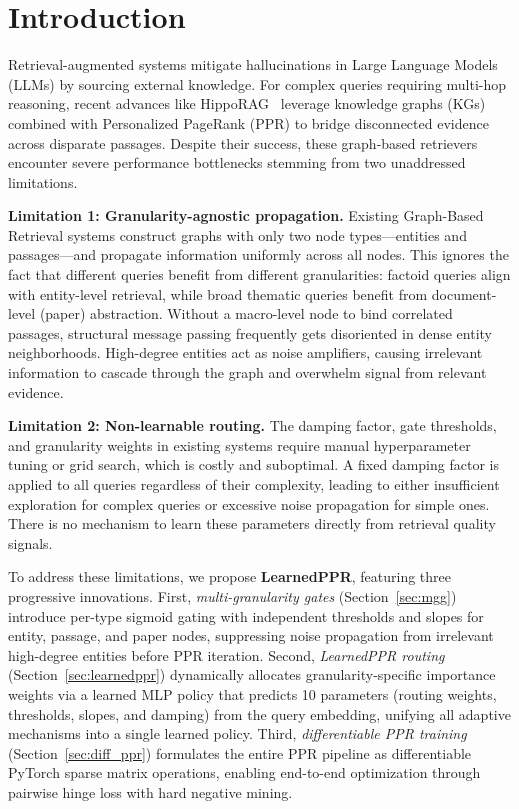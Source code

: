 \documentclass[conference,a4paper]{IEEEtran}
\begin{document}
\section{Introduction}\label{sec:intro}

Retrieval-augmented systems mitigate hallucinations in Large Language Models (LLMs) by sourcing external knowledge. For complex queries requiring multi-hop reasoning, recent advances like HippoRAG~\cite{gutierrez2024hipporag} leverage knowledge graphs (KGs) combined with Personalized PageRank (PPR) to bridge disconnected evidence across disparate passages. Despite their success, these graph-based retrievers encounter severe performance bottlenecks stemming from two unaddressed limitations.

\textbf{Limitation 1: Granularity-agnostic propagation.}
Existing Graph-Based Retrieval systems construct graphs with only two node types---entities and passages---and propagate information uniformly across all nodes. This ignores the fact that different queries benefit from different granularities: factoid queries align with entity-level retrieval, while broad thematic queries benefit from document-level (paper) abstraction. Without a macro-level node to bind correlated passages, structural message passing frequently gets disoriented in dense entity neighborhoods. High-degree entities act as noise amplifiers, causing irrelevant information to cascade through the graph and overwhelm signal from relevant evidence.

\textbf{Limitation 2: Non-learnable routing.}
The damping factor, gate thresholds, and granularity weights in existing systems require manual hyperparameter tuning or grid search, which is costly and suboptimal. A fixed damping factor is applied to all queries regardless of their complexity, leading to either insufficient exploration for complex queries or excessive noise propagation for simple ones. There is no mechanism to learn these parameters directly from retrieval quality signals.

To address these limitations, we propose \textbf{LearnedPPR}, featuring three progressive innovations. First, \textit{multi-granularity gates} (Section~\ref{sec:mgg}) introduce per-type sigmoid gating with independent thresholds and slopes for entity, passage, and paper nodes, suppressing noise propagation from irrelevant high-degree entities before PPR iteration. Second, \textit{LearnedPPR routing} (Section~\ref{sec:learnedppr}) dynamically allocates granularity-specific importance weights via a learned MLP policy that predicts 10 parameters (routing weights, thresholds, slopes, and damping) from the query embedding, unifying all adaptive mechanisms into a single learned policy. Third, \textit{differentiable PPR training} (Section~\ref{sec:diff_ppr}) formulates the entire PPR pipeline as differentiable PyTorch sparse matrix operations, enabling end-to-end optimization through pairwise hinge loss with hard negative mining.
\end{document}
